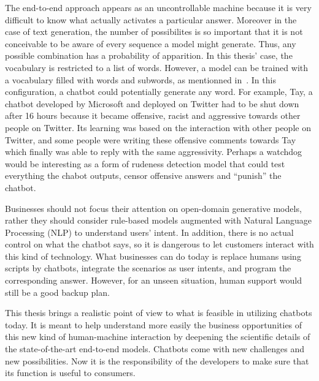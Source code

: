 The end-to-end approach appears as an uncontrollable machine because it is very difficult to know what actually activates a particular answer. Moreover in the case of text generation, the number of possibilites is so important that it is not conceivable to be aware of every sequence a model might generate. Thus, any possible combination has a probability of apparition.
In this thesis' case, the vocabulary is restricted to a list of words. However, a model can be trained with a vocabulary filled with words and subwords, as mentionned in~\cite{1508.07909}. In this configuration, a chatbot could potentially generate any word.
For example, Tay, a chatbot developed by Microsoft and deployed on Twitter had to be shut down after 16 hours because it became offensive, racist and aggressive towards other people on Twitter. Its learning was based on the interaction with other people on Twitter, and some people were writing these offensive comments towards Tay which finally was able to reply with the same aggressivity.
Perhaps a watchdog would be interesting as a form of rudeness detection model that could test everything the chabot outputs, censor offensive answers and ``punish'' the chatbot.

Businesses should not focus their attention on open-domain generative models, rather they should consider rule-based models augmented with Natural Language Processing (NLP) to understand users' intent. In addition, there is no actual control on what the chatbot says, so it is dangerous to let customers interact with this kind of technology.
What businesses can do today is replace humans using scripts by chatbots, integrate the scenarios as user intents, and program the corresponding answer. However, for an unseen situation, human support would still be a good backup plan.

This thesis brings a realistic point of view to what is feasible in utilizing chatbots today. It is meant to help understand more easily the business opportunities of this new kind of human-machine interaction by deepening the scientific details of the state-of-the-art end-to-end models.
Chatbots come with new challenges and new possibilities. Now it is the responsibility of the developers to make sure that its function is useful to consumers.
